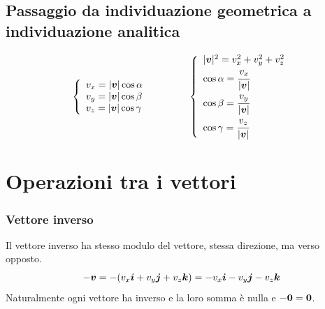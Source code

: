 \subsection{Passaggio da individuazione geometrica a individuazione analitica}
\begin{equation*}
\left\{
\begin{array}{l}
v_x=|\boldsymbol{v}|\cos\alpha\\
v_y=|\boldsymbol{v}|\cos\beta\\
v_z=|\boldsymbol{v}|\cos\gamma
\end{array}
\right. \qquad \qquad \left\{
\begin{array}{l}
|\boldsymbol{v}|^2=v_x^2+v_y^2+v_z^2\\
\cos\alpha=\cfrac{v_x}{|\boldsymbol{v}|}\\
\cos\beta=\cfrac{v_y}{|\boldsymbol{v}|}\\
\cos\gamma=\cfrac{v_z}{|\boldsymbol{v}|}
\end{array}
\right.
\end{equation*}


\section{Operazioni tra i vettori}

\subsubsection{Vettore inverso}
Il vettore inverso ha stesso modulo del vettore, stessa direzione,
ma verso opposto.
\begin{equation*}
-\boldsymbol{v}=-(v_x\boldsymbol{i}+v_y\boldsymbol{j}+v_z \boldsymbol{k})=-v_x\boldsymbol{i}-v_y\boldsymbol{j}-v_z\boldsymbol{k}
\end{equation*}
Naturalmente ogni vettore ha inverso e la loro somma è nulla e $-\boldsymbol{0}=\boldsymbol{0}$.

